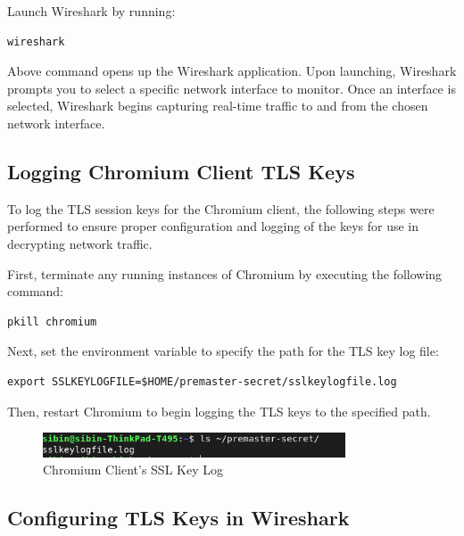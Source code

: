 Launch Wireshark by running:

\begin{lstlisting}[breaklines=true,basicstyle=\small\ttfamily,frame=single]
wireshark
\end{lstlisting}

Above command opens up the Wireshark application. Upon launching, Wireshark prompts you to select a specific network interface to monitor. Once an interface is selected, Wireshark begins capturing real-time traffic to and from the chosen network interface.



\subsection{Logging Chromium Client TLS Keys}
To log the TLS session keys for the Chromium client, the following steps were performed to ensure proper configuration and logging of the keys for use in decrypting network traffic.

First, terminate any running instances of Chromium by executing the following command:

\begin{lstlisting}[breaklines=true,basicstyle=\small\ttfamily,frame=single]
pkill chromium
\end{lstlisting}

Next, set the environment variable to specify the path for the TLS key log file:

\begin{lstlisting}[breaklines=true,basicstyle=\small\ttfamily,frame=single]
export SSLKEYLOGFILE=$HOME/premaster-secret/sslkeylogfile.log
\end{lstlisting}

Then, restart Chromium to begin logging the TLS keys to the specified path.

\begin{figure}[h!]
    \centering
    \includegraphics[width=0.8\textwidth]{implementation/sslkeylog.png}
    \caption{Chromium Client's SSL Key Log}
    \label{fig:chromiumssl}
\end{figure}

\subsection{Configuring TLS Keys in Wireshark}

